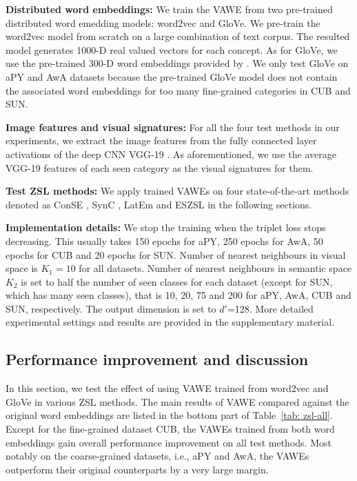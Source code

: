 \documentclass{bmvc2k}
\begin{document}
{\bf Distributed word embeddings:} We train the VAWE from two pre-trained distributed word emedding models: word2vec and GloVe. We pre-train the word2vec model from scratch on a large combination of text corpus.
The resulted model generates 1000-D real valued vectors for each concept.  As for GloVe, we use the pre-trained 300-D word embeddings provided by \cite{glove}.
  We only test GloVe on aPY and AwA datasets because the pre-trained GloVe model does not contain the associated word embeddings for too many fine-grained categories in CUB and SUN. %

{\bf Image features and visual signatures:} For all the four test methods in our experiments, we extract the image features from the fully connected layer activations of the deep CNN VGG-19 \cite{Simonyan14VGG}. As aforementioned, we use the average VGG-19 features of each seen category as the visual signatures for them.

{\bf Test ZSL methods:} We apply trained VAWEs on four state-of-the-art methods denoted as ConSE \cite{NorouziConse13}, SynC \cite{SynC2016}, LatEm \cite{LatEm2016} and ESZSL \cite{Romera2015ZSL} in the following sections.%


{\bf Implementation details:} We stop the training when the triplet loss stops decreasing. This usually takes 150 epochs for aPY, 250 epochs for AwA, 50 epochs for CUB and 20 epochs for SUN. Number of nearest neighbours in visual space is $K_1=10$ for all datasets. Number of nearest neighbours in semantic space $K_2$ is set to half the number of seen classes for each dataset (except for SUN, which has many seen classes), that is 10, 20, 75 and 200 for aPY, AwA, CUB and SUN,  respectively. The output dimension is set to $d'$=128. More detailed experimental settings and results are provided in the supplementary material.  %





\subsection{Performance improvement and discussion}
In this section, we test the effect of using VAWE trained from word2vec and GloVe in various ZSL methods. The main results of VAWE compared against the original word embeddings are listed in the bottom part of Table~\ref{tab: zsl-all}. Except for the fine-grained dataset CUB, the VAWEs trained from both word embeddings gain overall performance improvement on all test methods. Most notably on the coarse-grained datasets, i.e., aPY and AwA, the VAWEs outperform their original counterparts by a very large margin.
\end{document}
